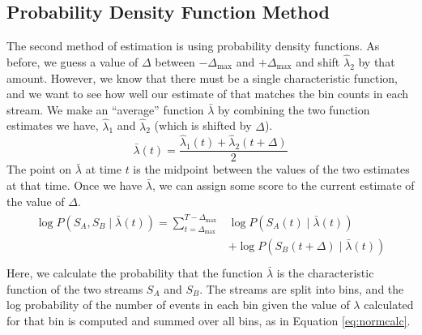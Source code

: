 \documentclass[a4paper,11pt,twoside]{article}
\begin{document}
\subsection{Probability Density Function Method}
\label{sec-5-2}

   The second method of estimation is using probability density functions. As
   before, we guess a value of $\Delta$ between $-\Delta_{\text{max}}$ and
   $+\Delta_{\text{max}}$ and shift $\hat{\lambda}_2$ by that amount. However,
   we know that there must be a single characteristic function, and we want to
   see how well our estimate of that matches the bin counts in each stream. We
   make an ``average'' function $\bar{\lambda}$ by combining the two function
   estimates we have, $\hat{\lambda}_1$ and $\hat{\lambda}_2$ (which is shifted
   by $\Delta$).
   \begin{equation}
   \bar{\lambda}(t)=\frac{\hat{\lambda}_1(t)+\hat{\lambda}_2(t+\Delta)}{2}
   \end{equation}
   The point on $\bar{\lambda}$ at time $t$ is the midpoint between the values of
   the two estimates at that time. Once we have $\bar{\lambda}$, we can assign some
   score to the current estimate of the value of $\Delta$.
   \begin{align}
   \begin{split}
   \log P(S_A,S_B\mid\bar{\lambda}(t))=\sum_{t=\Delta_{\text{max}}}^{T-\Delta_{\text{max}}}&\log P(S_A(t)\mid \bar{\lambda}(t))\\
   &+ \log P(S_B(t+\Delta)\mid \bar{\lambda}(t))\\
   \end{split}
   \end{align}
   Here, we calculate the probability that the function $\bar{\lambda}$ is the
   characteristic function of the two streams $S_A$ and $S_B$. The streams are
   split into bins, and the log probability of the number of events in each bin
   given the value of $\lambda$ calculated for that bin is computed and summed
   over all bins, as in Equation \eqref{eq:normcalc}.
\end{document}
